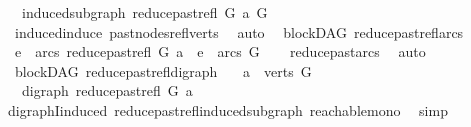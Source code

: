 \begin{isabellebody}
\ \ \ {\isachardoublequoteopen}induced{\isacharunderscore}{\kern0pt}subgraph\ {\isacharparenleft}{\kern0pt}reduce{\isacharunderscore}{\kern0pt}past{\isacharunderscore}{\kern0pt}refl\ G\ a{\isacharparenright}{\kern0pt}\ G{\isachardoublequoteclose}\isanewline
%
\isadelimproof
\ \ %
\endisadelimproof
%
\isatagproof
{}\isamarkupfalse%
\ \ induced{\isacharunderscore}{\kern0pt}induce\ past{\isacharunderscore}{\kern0pt}nodes{\isacharunderscore}{\kern0pt}refl{\isacharunderscore}{\kern0pt}verts\ \isamarkupfalse%
\ auto%
\endisatagproof
{\isafoldproof}%
%
\isadelimproof
\isanewline
%
\endisadelimproof
\isanewline
{}\isamarkupfalse%
\ {\isacharparenleft}{\kern0pt}\ blockDAG{\isacharparenright}{\kern0pt}\ reduce{\isacharunderscore}{\kern0pt}past{\isacharunderscore}{\kern0pt}refl{\isacharunderscore}{\kern0pt}arcs{}{\isacharcolon}{\kern0pt}\isanewline
\ \ {\isachardoublequoteopen}e\ {\isasymin}\ arcs\ {\isacharparenleft}{\kern0pt}reduce{\isacharunderscore}{\kern0pt}past{\isacharunderscore}{\kern0pt}refl\ G\ a{\isacharparenright}{\kern0pt}\ {\isasymLongrightarrow}\ e\ {\isasymin}\ arcs\ G{\isachardoublequoteclose}\isanewline
%
\isadelimproof
\ \ %
\endisadelimproof
%
\isatagproof
{}\isamarkupfalse%
\ reduce{\isacharunderscore}{\kern0pt}past{\isacharunderscore}{\kern0pt}arcs\ \isamarkupfalse%
\ auto%
\endisatagproof
{\isafoldproof}%
%
\isadelimproof
\isanewline
%
\endisadelimproof
\isanewline
{}\isamarkupfalse%
\ {\isacharparenleft}{\kern0pt}\ blockDAG{\isacharparenright}{\kern0pt}\ reduce{\isacharunderscore}{\kern0pt}past{\isacharunderscore}{\kern0pt}refl{\isacharunderscore}{\kern0pt}digraph{\isacharcolon}{\kern0pt}\isanewline
\ \ \ {\isachardoublequoteopen}a\ {\isasymin}\ verts\ G{\isachardoublequoteclose}\isanewline
\ \ \ {\isachardoublequoteopen}digraph\ {\isacharparenleft}{\kern0pt}reduce{\isacharunderscore}{\kern0pt}past{\isacharunderscore}{\kern0pt}refl\ G\ a{\isacharparenright}{\kern0pt}{\isachardoublequoteclose}\isanewline
%
\isadelimproof
\ \ %
\endisadelimproof
%
\isatagproof
{}\isamarkupfalse%
\ digraphI{\isacharunderscore}{\kern0pt}induced\ reduce{\isacharunderscore}{\kern0pt}past{\isacharunderscore}{\kern0pt}refl{\isacharunderscore}{\kern0pt}induced{\isacharunderscore}{\kern0pt}subgraph\ reachable{\isacharunderscore}{\kern0pt}mono\ \isamarkupfalse%
\ simp%
\endisatagproof
{\isafoldproof}%
%
\isadelimproof
\isanewline
%
\endisadelimproof

\end{isabellebody}
